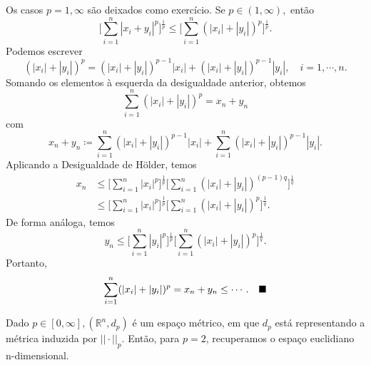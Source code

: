 \documentclass[MetricSpaces/metric_notes.tex]{subfiles}
\begin{document}
\begin{proof*}
	Os casos \(p=1, \infty\) são deixados como exercício. Se \(p\in(1, \infty),\) então
	\[
		\biggl[\sum\limits_{i=1}^{n}|x_{i}+y_{i}|^{p}\biggr]^{\frac{1}{p}}\leq \biggl[\sum\limits_{i=1}^{n}(|x_{i}|+|y_{i}|)^{p}\biggr]^{\frac{1}{p}}.
	\]
	Podemos escrever
	\[
		(|x_{i}|+|y_{i}|)^{p} = (|x_{i}|+|y_{i}|)^{p-1}|x_{i}|+(|x_{i}|+|y_{i}|)^{p-1}|y_{i}|,\quad i = 1, \cdots, n.
	\]
	Somando os elementos à esquerda da desigualdade anterior, obtemos
	\[
		\sum\limits_{i=1}^{n}(|x_{i}|+|y_{i}|)^{p} = x_{n}+y_{n}
	\]
	com
	\[
		x_{n} + y_{n}\coloneqq \sum\limits_{i=1}^{n}(|x_{i}|+|y_{i}|)^{p-1}|x_{i}| + \sum\limits_{i=1}^{n}(|x_{i}|+|y_{i}|)^{p-1}|y_{i}|.
	\]
	Aplicando a Desigualdade de Hölder, temos
	\begin{align*}
		x_{n} & \leq \biggl[\sum\limits_{i=1}^{n}|x_{i}|^{p}\biggr]^{\frac{1}{p}}\biggl[\sum\limits_{i=1}^{n}(|x_{i}|+|y_{i}|)^{(p-1)q}\biggr]^{\frac{1}{q}} \\
		      & \leq \biggl[\sum\limits_{i=1}^{n}|x_{i}|^{p}\biggr]^{\frac{1}{p}}\biggl[\sum\limits_{i=1}^{n}(|x_{i}|+|y_{i}|)^{p}\biggr]^{\frac{1}{q}}.
	\end{align*}
	De forma análoga, temos
	\[
		y_{n}\leq \biggl[\sum\limits_{i=1}^{n}|y_{i}|^{p}\biggr]^{\frac{1}{p}}\biggl[\sum\limits_{i=1}^{n}(|x_{i}|+|y_{i}|)^{p}\biggr]^{\frac{1}{q}}.
	\]
	Portanto,
	\[
		\sum\limits_{i=1}^{n}(|x_{i}|+|y_{i}|)^{p} = x_{n} + y_{n}\leq \cdots.\quad\text{$\blacksquare$}
	\]
\end{proof*}
\begin{example}
	Dado \(p\in[0, \infty], (\mathbb{R}^{n}, d_{p})\) é um espaço métrico, em que \(d_{p}\) está representando a métrica induzida por \(||\cdot ||_{p}.\) Então, para \(p=2\),
	recuperamos o espaço euclidiano n-dimensional.
\end{example}
\end{document}
